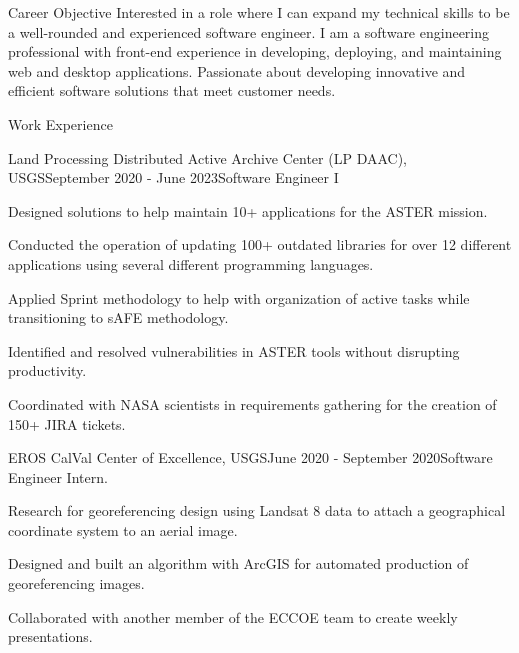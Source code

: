 \documentclass[11pt, a4paper]{resume}
\begin{document}
\begin{rSection}{Career Objective}
{\normalfont Interested in a role where I can expand my technical skills to be a well-rounded and experienced software engineer. I am a software engineering professional with front-end experience in developing, deploying, and maintaining web and desktop applications. Passionate about developing innovative and efficient software solutions that meet customer needs.}
\end{rSection}


\begin{rSection}{Work Experience}
\begin{rSubsection}{Land Processing Distributed Active Archive Center (LP DAAC), USGS}{\normalfont September 2020 - June 2023}{Software Engineer I}{}
 \item {\normalfont Designed solutions to help maintain 10+ applications for the ASTER mission.}
  \item {\normalfont Conducted the operation of updating 100+ outdated libraries for over 12 different applications using several different programming languages.}
 \item {\normalfont Applied Sprint methodology to help with organization of active tasks while transitioning to sAFE methodology.}
 \item {\normalfont Identified and resolved vulnerabilities in ASTER tools without disrupting productivity.}
 \item {\normalfont Coordinated with NASA scientists in requirements gathering for the creation of 150+ JIRA tickets.}
\end{rSubsection}
\begin{rSubsection}{EROS CalVal Center of Excellence, USGS}{\normalfont June 2020 - September 2020}{Software Engineer Intern.}{}
 \item {\normalfont Research for georeferencing design using Landsat 8 data to attach a geographical coordinate system to an aerial image.}
 \item {\normalfont Designed and built an algorithm with ArcGIS for automated production of georeferencing images.}
  \item {\normalfont Collaborated with another member of the ECCOE team to create weekly presentations.}
\end{rSubsection}

\end{rSection}
\end{document}
